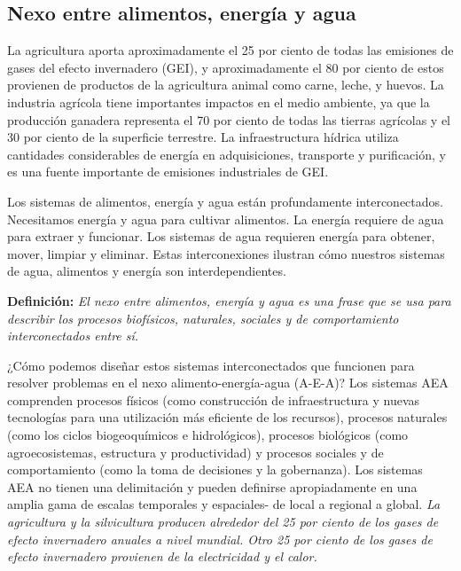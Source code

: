 \documentclass[runningheads]{llncs}
\begin{document}
\subsection*{Nexo entre alimentos, energía y agua}
La agricultura aporta aproximadamente el 25 por ciento de todas las emisiones de gases del efecto invernadero (GEI), y aproximadamente el 80 por ciento de estos provienen de productos de la agricultura animal como carne, leche, y huevos. La industria agrícola tiene importantes impactos en el medio ambiente, ya que la producción ganadera representa el 70 por ciento de todas las tierras agrícolas y el 30 por ciento de la superficie terrestre. La infraestructura hídrica utiliza cantidades considerables de energía en adquisiciones, transporte y purificación, y es una fuente importante de emisiones industriales de GEI.\\ \par 
Los sistemas de alimentos, energía y agua están profundamente interconectados. Necesitamos energía y agua para cultivar alimentos. La energía requiere de agua para extraer y funcionar. Los sistemas de agua requieren energía para obtener, mover, limpiar y eliminar. Estas interconexiones ilustran cómo nuestros sistemas de agua, alimentos y energía son interdependientes.\\ \par
\textbf{Definición:} \textit{El nexo entre alimentos, energía y agua es una frase que se usa para describir los procesos biofísicos, naturales, sociales y de comportamiento interconectados entre sí.}\\ \par
¿Cómo podemos diseñar estos sistemas interconectados que funcionen para resolver problemas en el nexo alimento-energía-agua (A-E-A)? Los sistemas AEA comprenden procesos físicos (como construcción de infraestructura y nuevas tecnologías para una utilización más eficiente de los recursos), procesos naturales (como los ciclos biogeoquímicos e hidrológicos), procesos biológicos (como agroecosistemas, estructura y productividad) y procesos sociales y de comportamiento (como la toma de decisiones y la gobernanza). Los sistemas AEA no tienen una delimitación y pueden definirse apropiadamente en una amplia gama de escalas temporales y espaciales- de local a regional a global.
\newpage
\textit{La agricultura y la silvicultura producen alrededor del 25 por ciento de los gases de efecto invernadero anuales a nivel mundial. Otro 25 por ciento de los gases de efecto invernadero provienen de la electricidad y el calor.}\\ \par
\end{document}
